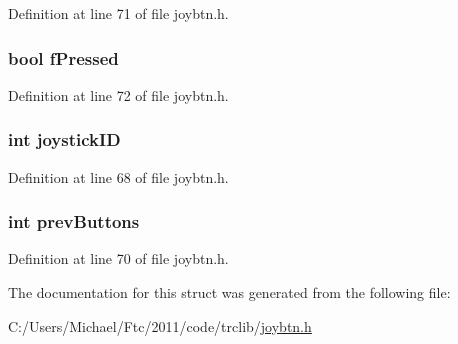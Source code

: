 Definition at line 71 of file joybtn.h.

\hypertarget{struct_j_o_y_b_t_n_a2fd58fb5dcf1164c5225c2bf60d6440d}{
\subsubsection[{fPressed}]{\setlength{\rightskip}{0pt plus 5cm}bool {\bf fPressed}}}
\label{struct_j_o_y_b_t_n_a2fd58fb5dcf1164c5225c2bf60d6440d}


Definition at line 72 of file joybtn.h.

\hypertarget{struct_j_o_y_b_t_n_aad862584085215cfd3bb4ae8f9bcc7d3}{
\subsubsection[{joystickID}]{\setlength{\rightskip}{0pt plus 5cm}int {\bf joystickID}}}
\label{struct_j_o_y_b_t_n_aad862584085215cfd3bb4ae8f9bcc7d3}


Definition at line 68 of file joybtn.h.

\hypertarget{struct_j_o_y_b_t_n_af88233c2d18dce7e96045e08dc63841e}{
\subsubsection[{prevButtons}]{\setlength{\rightskip}{0pt plus 5cm}int {\bf prevButtons}}}
\label{struct_j_o_y_b_t_n_af88233c2d18dce7e96045e08dc63841e}


Definition at line 70 of file joybtn.h.



The documentation for this struct was generated from the following file:\begin{DoxyCompactItemize}
\item 
C:/Users/Michael/Ftc/2011/code/trclib/\hyperlink{joybtn_8h}{joybtn.h}\end{DoxyCompactItemize}
